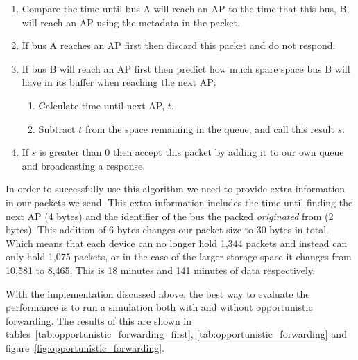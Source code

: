         \begin{enumerate}
            \item Compare the time until bus A will reach an AP to the time that this bus, B, will reach an AP using the metadata in the packet.
            \item If bus A reaches an AP first then discard this packet and do not respond.
            \item If bus B will reach an AP first then predict how much spare space bus B will have in its buffer when reaching the next AP:
                \begin{enumerate}
                    \item Calculate time until next AP, $t$.
                    \item Subtract $t$ from the space remaining in the queue, and call this result $s$.
                \end{enumerate}
            \item If $s$ is greater than 0 then accept this packet by adding it to our own queue and broadcasting a response.
        \end{enumerate}

        In order to successfully use this algorithm we need to provide extra information in our packets we send. This extra information includes the time until finding the next AP (4 bytes) and the identifier of the bus the packed \emph{originated} from (2 bytes). This addition of 6 bytes changes our packet size to 30 bytes in total. Which means that each device can no longer hold 1,344 packets and instead can only hold 1,075 packets, or in the case of the larger storage space it changes from 10,581 to 8,465. This is 18 minutes and 141 minutes of data respectively. 

        With the implementation discussed above, the best way to evaluate the performance is to run a simulation both with and without opportunistic forwarding. The results of this are shown in tables~\ref{tab:opportunistic_forwarding_first}, \ref{tab:opportunistic_forwarding} and figure~\ref{fig:opportunistic_forwarding}.

